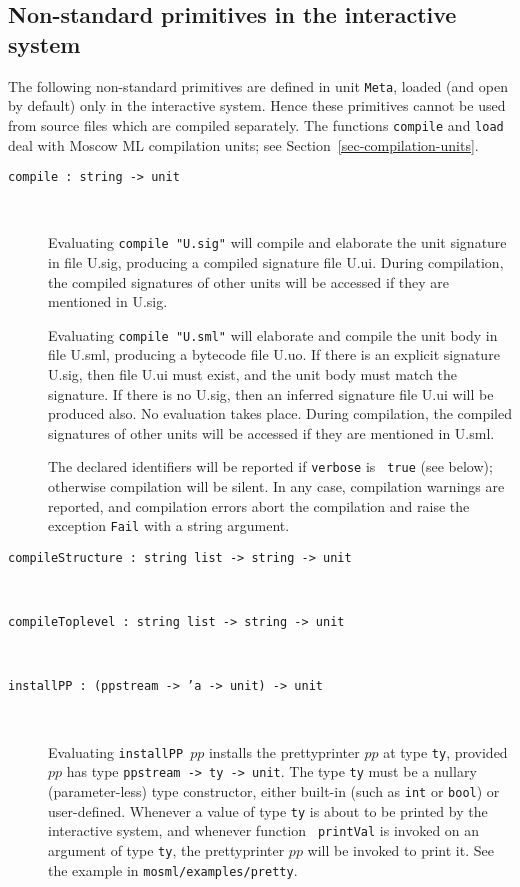 \documentclass[fleqn]{article}
\begin{document}
\subsection{Non-standard primitives in the interactive system}
\label{sec-nonstandard-interactive}

The following non-standard primitives are defined in unit {\tt Meta},
loaded (and open by default) only in the interactive system.  Hence
these primitives cannot be used from source files which are compiled
separately.  The functions {\tt compile} and {\tt load} deal with
Moscow ML compilation units; see Section~\ref{sec-compilation-units}.

\begin{description}

\item[{\tt compile :\ string -> unit}]\mbox{ }

  Evaluating {\tt compile "{\rm U.sig}"} will compile and elaborate
  the unit signature in file U.sig, producing a compiled signature
  file U.ui.  During compilation, the compiled signatures of other
  units will be accessed if they are mentioned in U.sig.

  Evaluating {\tt compile "{\rm U.sml}"} will elaborate and compile
  the unit body in file U.sml, producing a bytecode file U.uo.  If
  there is an explicit signature U.sig, then file U.ui must exist, and
  the unit body must match the signature.  If there is no U.sig, then
  an inferred signature file U.ui will be produced also.  No
  evaluation takes place.  During compilation, the compiled signatures
  of other units will be accessed if they are mentioned in U.sml.

  The declared identifiers will be reported if {\tt verbose} is {\tt
    true} (see below); otherwise compilation will be silent.  In any
    case, compilation warnings are reported, and compilation errors
    abort the compilation and raise the exception {\tt Fail} with a
    string argument.

\item[{\tt compileStructure :\ string list -> string -> unit}]\mbox{ }

\item[{\tt compileToplevel :\ string list -> string -> unit}]\mbox{ }

\item[{\tt installPP :\ (ppstream -> 'a -> unit) -> unit}]\mbox{ }

  Evaluating {\tt installPP $pp$} installs the prettyprinter $pp$ at
  type {\tt ty}, provided $pp$ has type {\tt ppstream -> ty -> unit}.
  The type {\tt ty} must be a nullary (parameter-less) type
  constructor, either built-in (such as {\tt int} or {\tt bool}) or
  user-defined.  Whenever a value of type {\tt ty} is about to be
  printed by the interactive system, and whenever function {\tt
    printVal} is invoked on an argument of type {\tt ty}, the
  prettyprinter $pp$ will be invoked to print it.  See the example in
  {\tt mosml/examples/pretty}.


\end{description}
\end{document}
